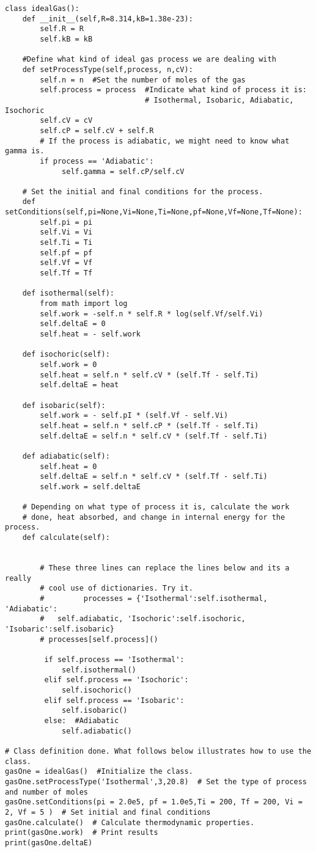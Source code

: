 \begin{Verbatim}
class idealGas():
    def __init__(self,R=8.314,kB=1.38e-23):
        self.R = R
        self.kB = kB
    
    #Define what kind of ideal gas process we are dealing with
    def setProcessType(self,process, n,cV):
        self.n = n  #Set the number of moles of the gas
        self.process = process  #Indicate what kind of process it is:
                                # Isothermal, Isobaric, Adiabatic, Isochoric
        self.cV = cV
        self.cP = self.cV + self.R
        # If the process is adiabatic, we might need to know what gamma is.
        if process == 'Adiabatic':  
             self.gamma = self.cP/self.cV

    # Set the initial and final conditions for the process.
    def setConditions(self,pi=None,Vi=None,Ti=None,pf=None,Vf=None,Tf=None):
        self.pi = pi
        self.Vi = Vi
        self.Ti = Ti
        self.pf = pf
        self.Vf = Vf
        self.Tf = Tf

    def isothermal(self):
        from math import log
        self.work = -self.n * self.R * log(self.Vf/self.Vi)
        self.deltaE = 0
        self.heat = - self.work
        
    def isochoric(self):
        self.work = 0
        self.heat = self.n * self.cV * (self.Tf - self.Ti)
        self.deltaE = heat
        
    def isobaric(self):
        self.work = - self.pI * (self.Vf - self.Vi)
        self.heat = self.n * self.cP * (self.Tf - self.Ti)
        self.deltaE = self.n * self.cV * (self.Tf - self.Ti)
        
    def adiabatic(self):
        self.heat = 0
        self.deltaE = self.n * self.cV * (self.Tf - self.Ti)
        self.work = self.deltaE

    # Depending on what type of process it is, calculate the work
    # done, heat absorbed, and change in internal energy for the process.
    def calculate(self):

        
        # These three lines can replace the lines below and its a really
        # cool use of dictionaries. Try it.
        #         processes = {'Isothermal':self.isothermal, 'Adiabatic':
        #   self.adiabatic, 'Isochoric':self.isochoric, 'Isobaric':self.isobaric}
        # processes[self.process]()

         if self.process == 'Isothermal':
             self.isothermal()
         elif self.process == 'Isochoric':
             self.isochoric()
         elif self.process == 'Isobaric':
             self.isobaric()
         else:  #Adiabatic
             self.adiabatic()

# Class definition done. What follows below illustrates how to use the class.
gasOne = idealGas()  #Initialize the class.
gasOne.setProcessType('Isothermal',3,20.8)  # Set the type of process and number of moles
gasOne.setConditions(pi = 2.0e5, pf = 1.0e5,Ti = 200, Tf = 200, Vi = 2, Vf = 5 )  # Set initial and final conditions
gasOne.calculate()  # Calculate thermodynamic properties.
print(gasOne.work)  # Print results
print(gasOne.deltaE)

\end{Verbatim}

